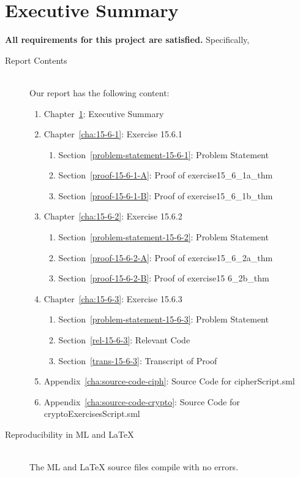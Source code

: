 \documentclass{report}
\begin{document}
\chapter{Executive Summary}
\label{cha:executive-summary}
\textbf{All requirements for this project are satisfied.}
Specifically,
\begin{description}
\item[Report Contents] \ \\
  Our report has the following content:
  \begin{enumerate}[{}]
  \item Chapter~\ref{cha:executive-summary}: Executive Summary
  \item Chapter~\ref{cha:15-6-1}: Exercise 15.6.1
    \begin{enumerate}[{}]
    \item Section~\ref{problem-statement-15-6-1}: Problem Statement
    \item Section~\ref{proof-15-6-1-A}: Proof of exercise15_6_1a_thm
    \item Section~\ref{proof-15-6-1-B}: Proof of exercise15_6_1b_thm
    \end{enumerate}
  \item Chapter~\ref{cha:15-6-2}: Exercise 15.6.2
    \begin{enumerate}[{}]
    \item Section~\ref{problem-statement-15-6-2}: Problem Statement
    \item Section~\ref{proof-15-6-2-A}: Proof of exercise15_6_2a_thm
    \item Section~\ref{proof-15-6-2-B}: Proof of exercise15 6_2b_thm
    \end{enumerate}
  \item Chapter~\ref{cha:15-6-3}: Exercise 15.6.3
    \begin{enumerate}[{}]
    \item Section~\ref{problem-statement-15-6-3}: Problem Statement
    \item Section~\ref{rel-15-6-3}: Relevant Code
    \item Section~\ref{trans-15-6-3}: Transcript of Proof
    \end{enumerate}
 \item Appendix~\ref{cha:source-code-ciph}: Source Code for cipherScript.sml
 \item Appendix~\ref{cha:source-code-crypto}: Source Code for cryptoExercisesScript.sml
  \end{enumerate}
\item[Reproducibility in ML and \LaTeX{}] \ \\
  The ML and \LaTeX{} source files compile with no errors.
\end{description}
\end{document}
